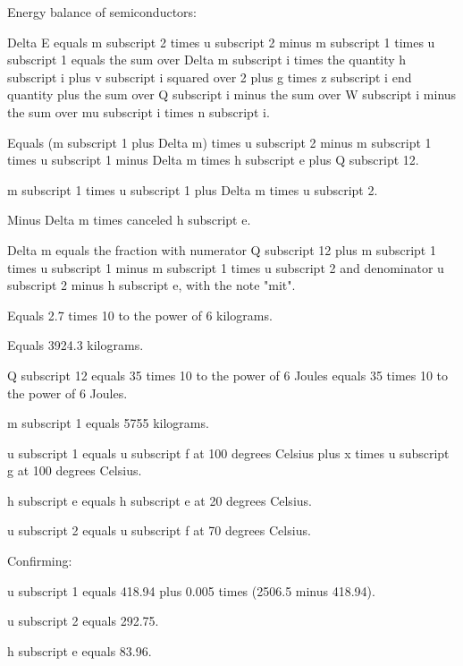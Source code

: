 Energy balance of semiconductors:

Delta E equals m subscript 2 times u subscript 2 minus m subscript 1 times u subscript 1 equals the sum over Delta m subscript i times the quantity h subscript i plus v subscript i squared over 2 plus g times z subscript i end quantity plus the sum over Q subscript i minus the sum over W subscript i minus the sum over mu subscript i times n subscript i.

Equals (m subscript 1 plus Delta m) times u subscript 2 minus m subscript 1 times u subscript 1 minus Delta m times h subscript e plus Q subscript 12.

m subscript 1 times u subscript 1 plus Delta m times u subscript 2.

Minus Delta m times canceled h subscript e.

Delta m equals the fraction with numerator Q subscript 12 plus m subscript 1 times u subscript 1 minus m subscript 1 times u subscript 2 and denominator u subscript 2 minus h subscript e, with the note "mit".

Equals 2.7 times 10 to the power of 6 kilograms.

Equals 3924.3 kilograms.

Q subscript 12 equals 35 times 10 to the power of 6 Joules equals 35 times 10 to the power of 6 Joules.

m subscript 1 equals 5755 kilograms.

u subscript 1 equals u subscript f at 100 degrees Celsius plus x times u subscript g at 100 degrees Celsius.

h subscript e equals h subscript e at 20 degrees Celsius.

u subscript 2 equals u subscript f at 70 degrees Celsius.

Confirming:

u subscript 1 equals 418.94 plus 0.005 times (2506.5 minus 418.94).

u subscript 2 equals 292.75.

h subscript e equals 83.96.